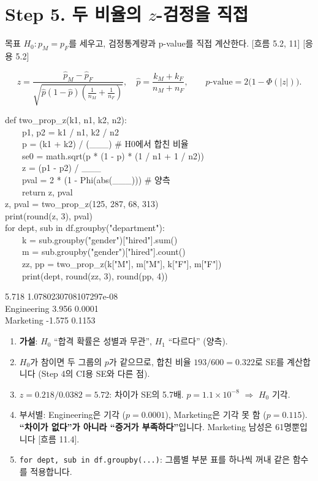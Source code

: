 \documentclass[11pt,a4paper]{article}
\newcommand{\code}[1]{\texttt{#1}}
\newcommand{\Wc}[1]{{\scriptsize\textsf{\color{blue!60!black}[흐름 #1]}}}
\newcommand{\Hc}[1]{{\scriptsize\textsf{\color{orange!70!black}[응용 #1]}}}
\begin{document}
\section{Step 5. 두 비율의 $z$-검정을 직접}
\begin{goalbox}{목표}
$H_0: p_M=p_F$를 세우고, 검정통계량과 p-value를 직접 계산한다. \Wc{5.2, 11} \Hc{5.2}
\end{goalbox}
\[
z=\frac{\hat p_M-\hat p_F}{\sqrt{\hat p(1-\hat p)\left(\frac1{n_M}+\frac1{n_F}\right)}},\quad \hat p=\frac{k_M+k_F}{n_M+n_F},\qquad p\text{-value}=2\big(1-\Phi(|z|)\big).
\]

\begin{codebox}
def two\_prop\_z(k1, n1, k2, n2):\\
\ \ \ \ p1, p2 = k1 / n1, k2 / n2\\
\ \ \ \ p = (k1 + k2) / (\_\_\_) \hfill \# H0에서 합친 비율\\
\ \ \ \ se0 = math.sqrt(p * (1 - p) * (1 / n1 + 1 / n2))\\
\ \ \ \ z = (p1 - p2) / \_\_\_\\
\ \ \ \ pval = 2 * (1 - Phi(abs(\_\_\_))) \hfill \# 양측\\
\ \ \ \ return z, pval\\[3pt]
z, pval = two\_prop\_z(125, 287, 68, 313)\\
print(round(z, 3), pval)\\
for dept, sub in df.groupby("department"):\\
\ \ \ \ k = sub.groupby("gender")["hired"].sum()\\
\ \ \ \ m = sub.groupby("gender")["hired"].count()\\
\ \ \ \ zz, pp = two\_prop\_z(k["M"], m["M"], k["F"], m["F"])\\
\ \ \ \ print(dept, round(zz, 3), round(pp, 4))
\end{codebox}
\begin{outbox}
5.718 1.0780230708107297e-08\\
Engineering 3.956 0.0001\\
Marketing -1.575 0.1153
\end{outbox}

\begin{howbox}
\begin{enumerate}
\item \textbf{가설}: $H_0$ ``합격 확률은 성별과 무관'', $H_1$ ``다르다'' (양측).
\item $H_0$가 참이면 두 그룹의 $p$가 같으므로, 합친 비율 $193/600=0.322$로 SE를 계산합니다 (Step 4의 CI용 SE와 다른 점).
\item $z=0.218/0.0382=5.72$: 차이가 SE의 5.7배. $p=1.1\times10^{-8}$ $\Rightarrow$ $H_0$ 기각.
\item 부서별: Engineering은 기각 ($p=0.0001$), Marketing은 기각 못 함 ($p=0.115$). \textbf{``차이가 없다''가 아니라 ``증거가 부족하다''}입니다. Marketing 남성은 61명뿐입니다 \Wc{11.4}.
\item \code{for dept, sub in df.groupby(...)}: 그룹별 부분 표를 하나씩 꺼내 같은 함수를 적용합니다.
\end{enumerate}
\end{howbox}
\end{document}
